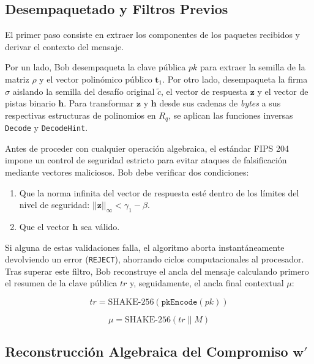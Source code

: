 \documentclass[11pt, a4paper]{report}
\theoremstyle{definition}
\begin{document}
\subsection{Desempaquetado y Filtros Previos}

El primer paso consiste en extraer los componentes de los paquetes recibidos y derivar el contexto del mensaje. 

Por un lado, Bob desempaqueta la clave pública $pk$ para extraer la semilla de la matriz $\rho$ y el vector polinómico público $\mathbf{t}_1$. Por otro lado, desempaqueta la firma $\sigma$ aislando la semilla del desafío original $\tilde{c}$, el vector de respuesta $\mathbf{z}$ y el vector de pistas binario $\mathbf{h}$. Para transformar $\mathbf{z}$ y $\mathbf{h}$ desde sus cadenas de \textit{bytes} a sus respectivas estructuras de polinomios en $R_q$, se aplican las funciones inversas \texttt{Decode} y \texttt{DecodeHint}.

Antes de proceder con cualquier operación algebraica, el estándar FIPS 204 impone un control de seguridad estricto para evitar ataques de falsificación mediante vectores maliciosos. Bob debe verificar dos condiciones:
\begin{enumerate}
    \item Que la norma infinita del vector de respuesta esté dentro de los límites del nivel de seguridad: $||\mathbf{z}||_\infty < \gamma_1 - \beta$.
    \item Que el vector $\mathbf{h}$ sea válido.
\end{enumerate}
Si alguna de estas validaciones falla, el algoritmo aborta instantáneamente devolviendo un error (\texttt{REJECT}), ahorrando ciclos computacionales al procesador. Tras superar este filtro, Bob reconstruye el ancla del mensaje calculando primero el resumen de la clave pública $tr$ y, seguidamente, el ancla final contextual $\mu$:

\begin{equation}
    tr = \text{SHAKE-256}(\texttt{pkEncode}(pk))
\end{equation}

\begin{equation}
    \mu = \text{SHAKE-256}(tr \parallel M)
\end{equation}

\subsection{Reconstrucción Algebraica del Compromiso $\mathbf{w}'$}
\end{document}
